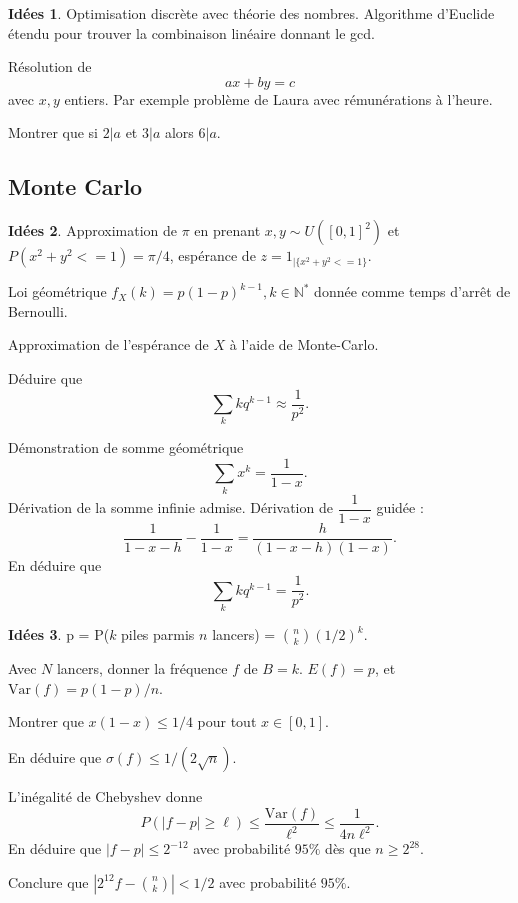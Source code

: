 \documentclass[a4paper,12pt, notitlepage]{article}
\theoremstyle{definition}
\newtheorem{idee}{Idées}
\newcommand{\N}{\mathbb{N}}
\newcommand{\Var}{\text{Var}}
\begin{document}
\begin{idee}
	Optimisation discrète avec théorie des nombres.
	Algorithme d'Euclide étendu pour trouver la combinaison linéaire donnant le gcd.
	
	Résolution de 
		\[ ax+ by = c \]
	avec $x,y$ entiers. Par exemple problème de Laura avec rémunérations à l'heure.

	Montrer que si $2|a$ et $3|a$ alors $6|a$.
\end{idee}

\subsection{Monte Carlo}

\begin{idee}
	Approximation de $\pi$ en prenant $x,y \sim U([0,1]^2)$ et $P(x^2 + y^2 <= 1) = \pi/4$, espérance de $z = 1_{|\{x^2 + y^2 <= 1\}}$.

	Loi géométrique $f_X(k) = p(1-p)^{k-1}, k\in\N^*$ donnée comme temps d'arrêt de Bernoulli.
	
	Approximation de l'espérance de $X$ à l'aide de Monte-Carlo.
	
	Déduire que 
		\[ \sum_k k q^{k-1} \approx \dfrac1{p^2}. \]
		
	Démonstration de somme géométrique
		\[ \sum_k x^k = \dfrac1{1-x}. \]
	Dérivation de la somme infinie admise. Dérivation de $\dfrac1{1-x}$ guidée : 
		\[ \dfrac1{1-x-h} - \dfrac1{1-x} = \dfrac{h}{(1-x-h)(1-x)}. \]
	En déduire que
		\[ \sum_k k q^{k-1} = \dfrac1{p^2}. \]
	
\end{idee}

\begin{idee}
	p = P($k$ piles parmis $n$ lancers) = ${n \choose k} (1/2)^k$.
	
	Avec $N$ lancers, donner la fréquence $f$ de $B=k$.
	$E(f) = p$, et $\Var(f) = p(1-p)/n$.
	
	Montrer que $x(1-x) \leq 1/4$ pour tout $x\in[0,1]$.
	
	En déduire que $\sigma(f) \leq 1/(2\sqrt{n})$.
	
	L'inégalité de Chebyshev donne
		\[ P( |f - p| \geq \ell ) \leq \dfrac{\Var(f)}{\ell^2} \leq \dfrac1{4n\ell^2}. \]
	En déduire que $|f-p| \leq 2^{-12}$ avec probabilité $95\%$ dès que $n \geq 2^28$.
	
	Conclure que $|2^{12} f - {n \choose k}| < 1/2$ avec probabilité $95\%$.
\end{idee}
\end{document}
